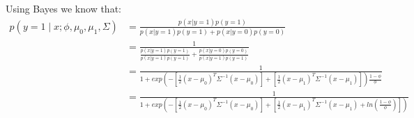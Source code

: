\begin{answer}
    Using Bayes we know that:
    $$
    \begin{aligned}
        p(y = 1\mid x; \phi, \mu_0, \mu_1, \Sigma) & = \frac{p(x|y=1)p(y=1)}{p(x|y=1)p(y=1) + p(x|y=0)p(y=0)}                                  \\
                                                   & = \frac{1}{\frac{p(x|y=1)p(y=1)}{p(x|y=1)p(y=1)} + \frac{p(x|y=0)p(y=0)}{p(x|y=1)p(y=1)}} \\
                                                   & = \frac{1}{1+exp(-[\frac{1}{2}(x-\mu_{0})^T \Sigma^{-1} (x-\mu_{0})]+[\frac{1}{2}(x-\mu_1)^T \Sigma^{-1} (x-\mu_1)])\frac{1-\phi}{\phi}}\\
                                                   &= \frac{1}{1+exp(-[\frac{1}{2}(x-\mu_{0})^T \Sigma^{-1} (x-\mu_{0})]+[\frac{1}{2}(x-\mu_1)^T \Sigma^{-1} (x-\mu_1) + ln(\frac{1-\phi}{\phi})])}
    \end{aligned}
    $$
\end{answer}
